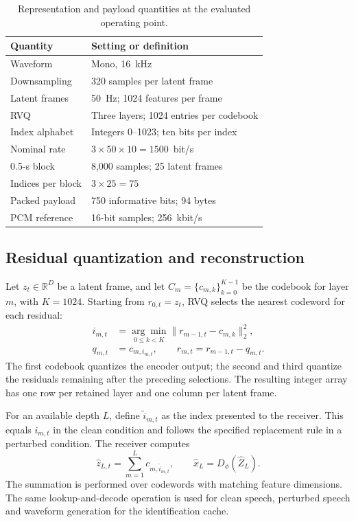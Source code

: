 \begin{table}[t]
\centering
\caption{Representation and payload quantities at the evaluated operating point.}
\label{tab:sv2-interface}
\small
\begin{tabularx}{\columnwidth}{@{}lY@{}}
\toprule
Quantity & Setting or definition\\
\midrule
Waveform & Mono, 16~kHz\\
Downsampling & 320 samples per latent frame\\
Latent frames & 50~Hz; 1024 features per frame\\
RVQ & Three layers; 1024 entries per codebook\\
Index alphabet & Integers 0--1023; ten bits per index\\
Nominal rate & $3\times50\times10=1500$~bit/s\\
0.5-s block & 8,000 samples; 25 latent frames\\
Indices per block & $3\times25=75$\\
Packed payload & 750 informative bits; 94 bytes\\
PCM reference & 16-bit samples; 256~kbit/s\\
\bottomrule
\end{tabularx}
\end{table}

\subsection{Residual quantization and reconstruction}
Let $z_t\in\mathbb{R}^{D}$ be a latent frame, and let $C_m=\{c_{m,k}\}_{k=0}^{K-1}$ be the codebook for layer $m$, with $K=1024$. Starting from $r_{0,t}=z_t$, RVQ selects the nearest codeword for each residual:
\begin{align}
 i_{m,t}&=\underset{0\leq k<K}{\arg\min}
           \|r_{m-1,t}-c_{m,k}\|_2^2,\label{eq:sv2-rvq}\\
 q_{m,t}&=c_{m,i_{m,t}},\qquad
 r_{m,t}=r_{m-1,t}-q_{m,t}.\nonumber
\end{align}
The first codebook quantizes the encoder output; the second and third quantize the residuals remaining after the preceding selections. The resulting integer array has one row per retained layer and one column per latent frame.

For an available depth $L$, define $\widetilde i_{m,t}$ as the index presented to the receiver. This equals $i_{m,t}$ in the clean condition and follows the specified replacement rule in a perturbed condition. The receiver computes
\begin{equation}
 \hat z_{L,t}=\sum_{m=1}^{L}c_{m,\widetilde i_{m,t}},
 \qquad \hat x_L=D_\phi(\hat Z_L).
 \label{eq:sv2-decode}
\end{equation}
The summation is performed over codewords with matching feature dimensions. The same lookup-and-decode operation is used for clean speech, perturbed speech and waveform generation for the identification cache.

